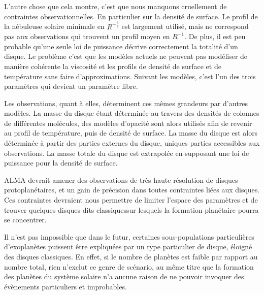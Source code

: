 L'autre chose que cela montre, c'est que nous manquons cruellement de contraintes observationnelles. En particulier sur la densité de surface. Le profil de la nébuleuse solaire minimale en $R^{-\frac{3}{2}}$ est largement utilisé, mais ne correspond pas aux observations qui trouvent un profil moyen en $R^{-1}$. De plus, il est peu probable qu'une seule loi de puissance décrive correctement la totalité d'un disque. Le problème c'est que les modèles actuels ne peuvent pas modéliser de manière cohérente la viscosité et les profils de densité de surface et de température sans faire d'approximations. Suivant les modèles, c'est l'un des trois paramètres qui devient un paramètre libre. 

Les observations, quant à elles, déterminent ces mêmes grandeurs par d'autres modèles. La masse du disque étant déterminée au travers des densités de colonnes de différentes molécules, des modèles d'opacité sont alors utilisés afin de revenir au profil de température, puis de densité de surface. La masse du disque est alors déterminée à partir des parties externes du disque, uniques parties accessibles aux observations. La masse totale du disque est extrapolée en supposant une loi de puissance pour la densité de surface. 

ALMA devrait amener des observations de très haute résolution de disques protoplanétaires, et un gain de précision dans toutes contraintes liées aux disques. Ces contraintes devraient nous permettre de limiter l'espace des paramètres et de trouver quelques disques dits \og classiques\fg sur lesquels la formation planétaire pourra se concentrer. 

Il n'est pas impossible que dans le futur, certaines sous-populations particulières d'exoplanètes puissent être expliquées par un type particulier de disque, éloigné des disques classiques. En effet, si le nombre de planètes est faible par rapport au nombre total, rien n'exclut ce genre de scénario, au même titre que la formation des planètes du système solaire n'a aucune raison de ne pouvoir invoquer des évènements particuliers et improbables. 


